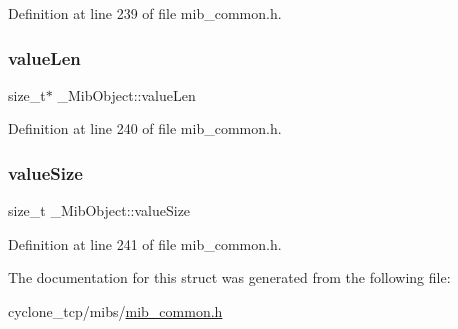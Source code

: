 Definition at line 239 of file mib\+\_\+common.\+h.

\mbox{\label{struct__MibObject_ac28bea8e33a7482287f12f201f937710}} 
\subsubsection{\texorpdfstring{value\+Len}{valueLen}}
{\footnotesize\ttfamily size\+\_\+t$\ast$ \+\_\+\+Mib\+Object\+::value\+Len}



Definition at line 240 of file mib\+\_\+common.\+h.

\mbox{\label{struct__MibObject_a7593675d0c742ab5b5cc6256a38eff07}} 
\subsubsection{\texorpdfstring{value\+Size}{valueSize}}
{\footnotesize\ttfamily size\+\_\+t \+\_\+\+Mib\+Object\+::value\+Size}



Definition at line 241 of file mib\+\_\+common.\+h.



The documentation for this struct was generated from the following file\+:\begin{DoxyCompactItemize}
\item 
cyclone\+\_\+tcp/mibs/\hyperlink{mib__common_8h}{mib\+\_\+common.\+h}\end{DoxyCompactItemize}
